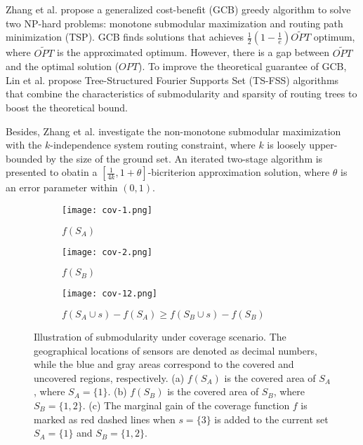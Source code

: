 Zhang et al. \cite{zhang2016submodular} propose a generalized cost-benefit (GCB) greedy algorithm
to solve two NP-hard problems: monotone submodular maximization and routing path minimization (TSP).
GCB finds solutions that achieves $\frac{1}{2}(1-\frac{1}{e})\widetilde{OPT}$ optimum, where $\widetilde{OPT}$ is the approximated optimum.
However, there is a gap between $\widetilde{OPT}$ and the optimal solution ($OPT$). To improve the theoretical guarantee of GCB, Lin et al. \cite{Lin2023ST} propose Tree-Structured Fourier Supports Set (TS-FSS) algorithms that combine the characteristics of submodularity and sparsity of routing trees to boost the theoretical bound.

Besides, Zhang et al. \cite{zhang2022nonmonontone} investigate the non-monotone submodular maximization with the $k$-independence system routing constraint, where $k$ is loosely upper-bounded by the size of the ground set.
An iterated two-stage algorithm is presented to obatin a $[\frac{1}{4k}, 1+\theta]$-bicriterion approximation solution, where $\theta$ is an error parameter within $(0,1)$.

\begin{figure}
    \centering
    \begin{subfigure}[b]{0.35\textwidth}
        \texttt{[image: cov-1.png]}
        \caption{$f(S_A)$}
    \end{subfigure}
    \begin{subfigure}[b]{0.35\textwidth}
        \texttt{[image: cov-2.png]}
        \caption{$f(S_B)$}
    \end{subfigure}
    \hfill

    \begin{subfigure}[b]{0.8\textwidth}
    \centering
        \texttt{[image: cov-12.png]}
        \caption{$f(S_A \cup s)-f(S_A) \geq f(S_B \cup s)-f(S_B)$ } \label{fig:AB-cov}
    \end{subfigure}

    \caption{Illustration of submodularity under coverage scenario. The geographical locations of sensors are denoted as decimal numbers, while the blue and gray areas correspond to the covered and uncovered regions, respectively. (a) $f(S_A)$ is the covered area of $S_A$, where $S_A=\{1\}$. (b) $f(S_B)$ is the covered area of $S_B$, where $S_B=\{1,2\}$. (c) The marginal gain of the coverage function $f$ is marked as red dashed lines when $s=\{3\}$ is added to the current set $S_A=\{1\}$ and $S_B=\{1,2\}$.
    }
    \label{submodularity}
\end{figure}


